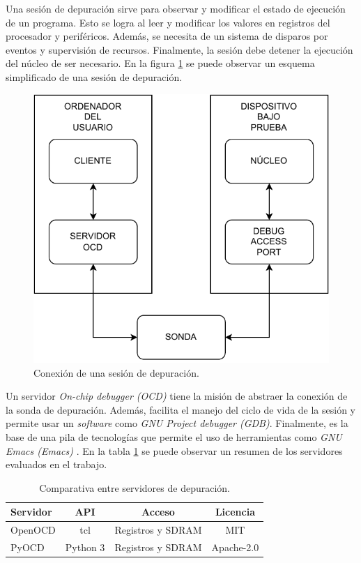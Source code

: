 Una sesión de depuración sirve para observar y modificar el estado de ejecución de un programa.
Esto se logra al leer y modificar los valores en registros del procesador y periféricos.
Además, se necesita de un sistema de disparos por eventos y supervisión de recursos.
Finalmente, la sesión debe detener la ejecución del núcleo de ser necesario.
En la figura \ref{fig:debug} se puede observar un esquema simplificado de una sesión de depuración.

\begin{figure}[htbp]
	\centering
	\includegraphics[width=.8\textwidth]{./Figures/debug.pdf}
    \caption{Conexión de una sesión de depuración.}
	\label{fig:debug}
\end{figure}

Un servidor \emph{On-chip debugger (OCD)} tiene la misión de abstraer la conexión de la sonda de depuración.
Además, facilita el manejo del ciclo de vida de la sesión y permite usar un \emph{software} como \emph{GNU Project debugger (GDB)}.
Finalmente, es la base de una pila de tecnologías que permite el uso de herramientas como \emph{GNU Emacs (Emacs)} \citep{BOOK:gdb}.
En la tabla \ref{tab:servidores} se puede observar un resumen de los servidores evaluados en el trabajo.

\begin{table}[h]
	\centering
	\caption[Servidores de depuración]{Comparativa entre servidores de depuración.}
	\begin{tabular}{l c c c}    
		\toprule
        \textbf{Servidor} & \textbf{API} & \textbf{Acceso}   & \textbf{Licencia}\\
		\midrule
        OpenOCD           & tcl                         & Registros y SDRAM & MIT\\        	
        PyOCD             & Python 3                    & Registros y SDRAM & Apache-2.0\\
		\bottomrule
		\hline
	\end{tabular}
	\label{tab:servidores}
\end{table}

